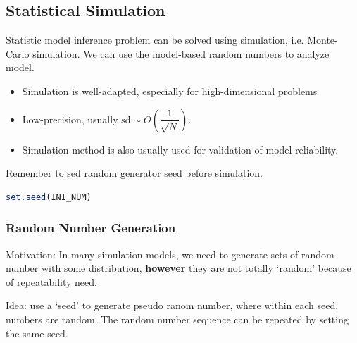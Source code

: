         
        
        

\subsection{Statistical Simulation}\label{SubSectionStatisticalSimulation}
    Statistic model inference problem can be solved using simulation, i.e. Monte-Carlo simulation. We can use the model-based random numbers to analyze model.
\begin{itemize}[topsep=2pt,itemsep=0pt]
    \item Simulation is well-adapted, especially for high-dimensional problems
    \item Low-precision, usually $ \mathrm{sd} \sim O(\dfrac{1}{\sqrt{N}}) $. 
    \item Simulation method is also usually used for validation of model reliability.
\end{itemize}

\begin{rcode}
    Remember to sed random generator seed before simulation.
\begin{lstlisting}[language=R]
set.seed(INI_NUM)
\end{lstlisting}
\end{rcode}
    
\subsubsection{Random Number Generation}\label{SubSectionRandomNumberGeneration}
    Motivation: In many simulation models, we need to generate sets of random number with some distribution, \textbf{however} they are not totally `random' because of repeatability need. 

    Idea: use a `seed' to generate pseudo ranom number, where within each seed, numbers are random. The random number sequence can be repeated by setting the same seed.

